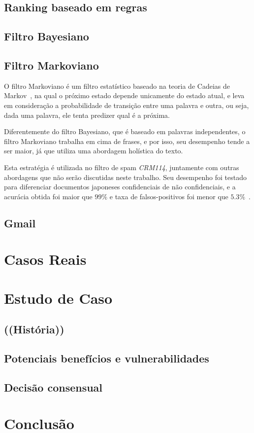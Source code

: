 \documentclass{article}
\begin{document}
	\subsection{Ranking baseado em regras}
	\subsection{Filtro Bayesiano}
		
	\subsection{Filtro Markoviano}
		O filtro Markoviano é um filtro estatístico baseado na teoria de Cadeias de Markov~\cite{markov}, na qual o próximo estado depende unicamente do estado atual, e leva em consideração a probabilidade de transição entre uma palavra e outra, ou seja, dada uma palavra, ele tenta predizer qual é a próxima.

		Diferentemente do filtro Bayesiano, que é baseado em palavras independentes, o filtro Markoviano trabalha em cima de frases, e por isso, seu desempenho tende a ser maior, já que utiliza uma abordagem holística do texto.
		
	Esta estratégia é utilizada no filtro de spam \emph{CRM114}, juntamente com outras abordagens que não serão discutidas neste trabalho. Seu desempenho foi testado para diferenciar documentos japoneses confidenciais de não confidenciais, e a acurácia obtida foi maior que $99\%$ e taxa de falsos-positivos foi menor que $5.3\%$~\cite{fmarkov:japtest}.

	\subsection{Gmail}

\section{Casos Reais}

\section{Estudo de Caso}
\subsection{((História))}
\subsection{Potenciais benefícios e vulnerabilidades}
\subsection{Decisão consensual}

\section{Conclusão}
\end{document}
